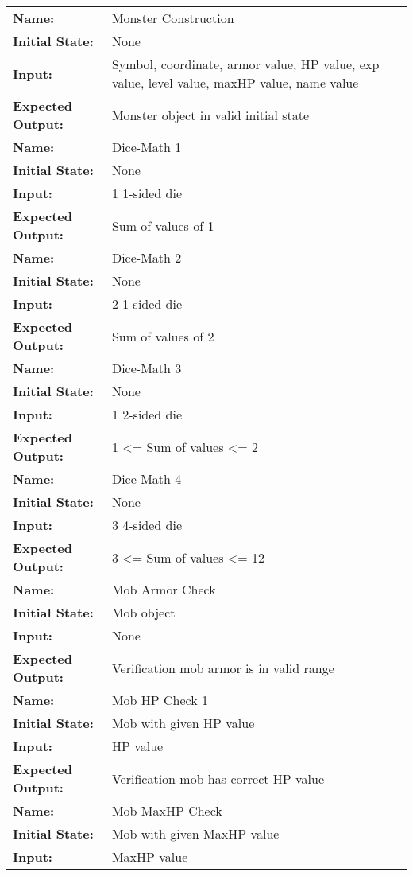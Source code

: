 \documentclass[12pt, titlepage]{article}
\begin{document}
\begin{center}
\begin{longtable}{ l | l }
\hline
\textbf{Name:} & Monster Construction\\
\textbf{Initial State:} & None\\
\textbf{Input:} & Symbol, coordinate, armor value, HP value, exp value, level value, maxHP value, name value\\
\textbf{Expected Output:} & Monster object in valid initial state\\
\hline
\textbf{Name:} & Dice-Math 1\\
\textbf{Initial State:} & None\\
\textbf{Input:} & 1 1-sided die\\
\textbf{Expected Output:} & Sum of values of 1\\
\hline
\textbf{Name:} & Dice-Math 2\\
\textbf{Initial State:} & None\\
\textbf{Input:} & 2 1-sided die\\
\textbf{Expected Output:} & Sum of values of 2\\
\hline
\textbf{Name:} & Dice-Math 3\\
\textbf{Initial State:} & None\\
\textbf{Input:} & 1 2-sided die\\
\textbf{Expected Output:} & 1 <= Sum of values <= 2\\
\hline
\textbf{Name:} & Dice-Math 4\\
\textbf{Initial State:} & None\\
\textbf{Input:} & 3 4-sided die\\
\textbf{Expected Output:} & 3 <= Sum of values <= 12\\
\hline
\textbf{Name:} & Mob Armor Check\\
\textbf{Initial State:} & Mob object\\
\textbf{Input:} & None\\
\textbf{Expected Output:} & Verification mob armor is in valid range\\
\hline
\textbf{Name:} & Mob HP Check 1\\
\textbf{Initial State:} & Mob with given HP value\\
\textbf{Input:} & HP value\\
\textbf{Expected Output:} & Verification mob has correct HP value\\
\hline
\textbf{Name:} & Mob MaxHP Check\\
\textbf{Initial State:} & Mob with given MaxHP value\\
\textbf{Input:} & MaxHP value\\

\end{longtable}
\end{center}
\end{document}
